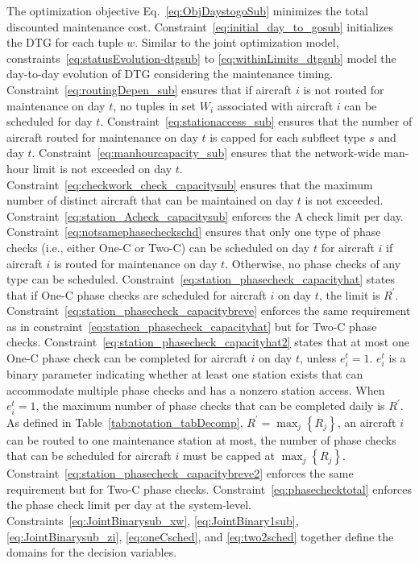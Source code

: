 The optimization objective Eq.~\eqref{eq:ObjDaystogoSub} minimizes the total discounted maintenance cost. 
Constraint~\eqref{eq:initial_day_to_gosub} initializes the DTG for each tuple $w$. Similar to the joint optimization model, constraints~\eqref{eq:statusEvolution-dtgsub} to \eqref{eq:withinLimits_dtgsub} model the day-to-day evolution of DTG considering the maintenance timing.
Constraint~\eqref{eq:routingDepen_sub} ensures that if aircraft $i$ is not routed for maintenance on day $t$, no tuples in set $W_i$ associated with aircraft $i$ can be scheduled for day $t$.
Constraint~\eqref{eq:stationaccess_sub} ensures that the number of aircraft routed for maintenance on day $t$ is capped for each subfleet type $s$ and day $t$.
Constraint~\eqref{eq:manhourcapacity_sub} ensures that the network-wide man-hour limit is not exceeded on day $t$. 
Constraint~\eqref{eq:checkwork_check_capacitysub} ensures that the maximum number of distinct aircraft that can be maintained on day $t$ is not exceeded. 
Constraint~\eqref{eq:station_Acheck_capacitysub} enforces the A check limit per day.
Constraint~\eqref{eq:notsamephasecheckschd} ensures that only one type of phase checks (i.e., either One-C or Two-C) can be scheduled on day $t$ for aircraft $i$ if aircraft $i$ is routed for maintenance on day $t$. Otherwise, no phase checks of any type can be scheduled.
Constraint~\eqref{eq:station_phasecheck_capacityhat} states that if One-C phase checks are scheduled for aircraft $i$ on day $t$, the limit is $R^{\prime}$. Constraint~\eqref{eq:station_phasecheck_capacitybreve} enforces the same requirement as in constraint~\eqref{eq:station_phasecheck_capacityhat} but for Two-C phase checks. 
Constraint~\eqref{eq:station_phasecheck_capacityhat2} states that at most one One-C phase check can be completed for aircraft $i$ on day $t$, unless $e_i^t = 1$. $e_i^t$ is a binary parameter indicating whether at least one station exists that can accommodate multiple phase checks and has a nonzero station access.
When $e_i^t = 1$, the maximum number of phase checks that can be completed daily is $R^{\prime}$. As defined in Table~\ref{tab:notation_tabDecomp}, $R^{\prime} = \max_j\left\{R_j\right\}$, an aircraft $i$ can be routed to one maintenance station at most, the number of phase checks that can be scheduled for aircraft $i$ must be capped at $\max_j\left\{R_j\right\}$.
Constraint~\eqref{eq:station_phasecheck_capacitybreve2} enforces the same requirement but for Two-C phase checks.
Constraint~\eqref{eq:phasechecktotal} enforces the phase check limit per day at the system-level.
Constraints~\eqref{eq:JointBinarysub_xw}, \eqref{eq:JointBinary1sub}, \eqref{eq:JointBinarysub_zi}, \eqref{eq:oneCsched}, and  \eqref{eq:two2sched} together define the domains for the decision variables.

